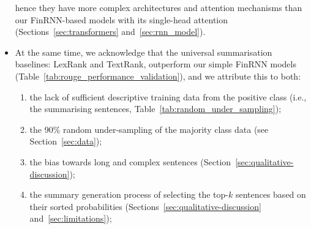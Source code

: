 \begin{itemize}
    hence they have more complex architectures and attention mechanisms than our FinRNN-based models with its single-head attention (Sections~\ref{sec:transformers} and~\ref{sec:rnn_model}).
    \item At the same time, we acknowledge that the universal summarisation baselines: LexRank and TextRank, outperform
        our simple FinRNN models (Table~\ref{tab:rouge_performance_validation}), and we attribute this to both:
    \begin{enumerate}%
        \item the lack of sufficient descriptive training data from the positive class (i.e., the summarising sentences, Table~\ref{tab:random_under_sampling});
        \item the 90\% random under-sampling of the majority class data (see Section~\ref{sec:data});
        \item the bias towards long and complex sentences (Section~\ref{sec:qualitative-discussion});
        \item the summary generation process of selecting the top-$k$ sentences based on their sorted probabilities (Sections~\ref{sec:qualitative-discussion} and~\ref{sec:limitations});
    \end{enumerate}
\end{itemize}


